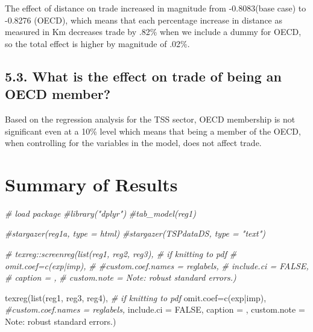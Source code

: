 \documentclass[
]{article}
\newenvironment{Shaded}{\begin{snugshade}}{\end{snugshade}}
\newcommand{\AttributeTok}[1]{\textcolor[rgb]{0.77,0.63,0.00}{#1}}
\newcommand{\CommentTok}[1]{\textcolor[rgb]{0.56,0.35,0.01}{\textit{#1}}}
\newcommand{\ConstantTok}[1]{\textcolor[rgb]{0.00,0.00,0.00}{#1}}
\newcommand{\FunctionTok}[1]{\textcolor[rgb]{0.00,0.00,0.00}{#1}}
\newcommand{\NormalTok}[1]{#1}
\newcommand{\StringTok}[1]{\textcolor[rgb]{0.31,0.60,0.02}{#1}}
\begin{document}
The effect of distance on trade increased in magnitude from -0.8083(base
case) to -0.8276 (OECD), which means that each percentage increase in
distance as measured in Km decreases trade by .82\% when we include a
dummy for OECD, so the total effect is higher by magnitude of .02\%.

\hypertarget{what-is-the-effect-on-trade-of-being-an-oecd-member}{%
\subsection{5.3. What is the effect on trade of being an OECD
member?}\label{what-is-the-effect-on-trade-of-being-an-oecd-member}}

Based on the regression analysis for the TSS sector, OECD membership is
not significant even at a 10\% level which means that being a member of
the OECD, when controlling for the variables in the model, does not
affect trade.

\hypertarget{summary-of-results}{%
\section{Summary of Results}\label{summary-of-results}}

\begin{Shaded}
\begin{Highlighting}[]
\CommentTok{\# load package}
\CommentTok{\#library("dplyr")}
\CommentTok{\#tab\_model(reg1)}

\CommentTok{\#stargazer(reg1a, type = \textquotesingle{}html\textquotesingle{})}
\CommentTok{\#stargazer(TSPdataDS, type = "text")}

\CommentTok{\# texreg::screenreg(list(reg1, reg2, reg3),     \# if knitting to pdf}
\CommentTok{\#                   omit.coef=c(\textquotesingle{}exp|imp\textquotesingle{}),}
\CommentTok{\# \#custom.coef.names = reglabels,}
\CommentTok{\# include.ci = FALSE,}
\CommentTok{\# caption = \textquotesingle{}\textquotesingle{},}
\CommentTok{\# custom.note = \textquotesingle{}Note: robust standard errors.\textquotesingle{})}

\FunctionTok{texreg}\NormalTok{(}\FunctionTok{list}\NormalTok{(reg1, reg3, reg4),     }\CommentTok{\# if knitting to pdf}
                  \AttributeTok{omit.coef=}\FunctionTok{c}\NormalTok{(}\StringTok{\textquotesingle{}exp|imp\textquotesingle{}}\NormalTok{),}
\CommentTok{\#custom.coef.names = reglabels,}
\AttributeTok{include.ci =} \ConstantTok{FALSE}\NormalTok{,}
\AttributeTok{caption =} \StringTok{\textquotesingle{}\textquotesingle{}}\NormalTok{,}
\AttributeTok{custom.note =} \StringTok{\textquotesingle{}Note: robust standard errors.\textquotesingle{}}\NormalTok{)}
\end{Highlighting}
\end{Shaded}
\end{document}
